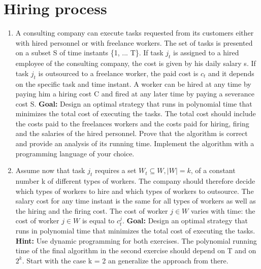 \section{Hiring process}
\begin{enumerate}
	\item A consulting company can execute tasks requested from its customers either with hired personnel or with freelance workers. The set of tasks is presented on a subset S of time instants \{1, ... T\}. If task $j_t$ is assigned to a hired employee of the consulting company, the cost is given by his daily salary s. If task $j_t$ is outsourced to a freelance worker, the paid cost is $c_t$ and it depends on the specific task and time instant. A worker can be hired at any time by paying him a hiring cost C and fired at any later time by paying a severance cost S.
	\newline
	\textbf{Goal:} Design an optimal strategy that runs in polynomial time that minimizes the total cost of executing the tasks. The total cost should include the costs paid to the freelances workers and the costs paid for hiring, firing and the salaries of the hired personnel. Prove that the algorithm is correct and provide an analysis of its running time. Implement the algorithm with a programming language of your choice.
	\item Assume now that task $j_t$ requires a set $W_t \subseteq W, |W| = k$, of a constant number k of different types of workers. The company should therefore decide which types of workers to hire and which types of workers to outsource. The salary cost for any time instant is the same for all types of workers as well as the hiring and the firing cost. The cost of worker $j \in W$ varies with time: the cost of worker $j \in W$ is equal to $c_t^j$.
	\newline
	\textbf{Goal:} Design an optimal strategy that runs in polynomial time that minimizes the total cost of executing the tasks.
	\newline
	\textbf{Hint:} Use dynamic programming for both exercises. The polynomial running time of the	final algorithm in the second exercise should depend on T and on $2^k$. Start with the case k = 2 an generalize the approach from there.
\end{enumerate}

